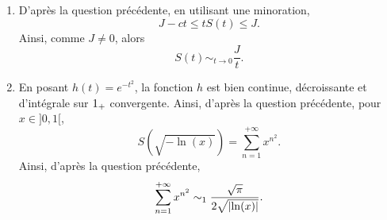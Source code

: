 \begin{demo}
\begin{enumerate}
\item D'après la question précédente, en utilisant une minoration,
\[
J - c t \leq t S(t) \leq J.
\]
Ainsi, comme $J \neq 0$, alors
\[
S(t) \sim_{t\to0} \frac{J}{t}.
\]

\item En posant $h(t) = e^{-t^2}$, la fonction $h$ est bien continue, décroissante et d'intégrale sur $1_+$ convergente. Ainsi, d'après la question précédente, pour $x \in ]0, 1[$,
\[
S(\sqrt{-\ln(x)}) = \sum_{n=1}^{+\infty} x^{n^2}.
\]
Ainsi, d'après la question précédente,
\[
\sum_{n=1}^{+\infty} x^{n^2} \sim_1 \frac{\sqrt{\pi}}{2 \sqrt{\abs{\ln(x)}}}.
\]
\end{enumerate}
\end{demo}
